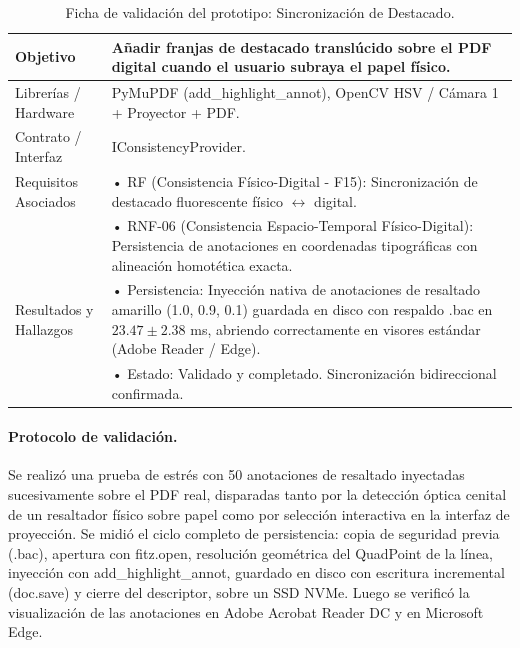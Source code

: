 \begin{table}[H]
    \centering
    \caption{Ficha de validación del prototipo: Sincronización de Destacado.}
    \label{tab:ficha_f15}
    \begin{tabular}{L{3.2cm} L{11.0cm}}
        \toprule
        Objetivo & Añadir franjas de destacado translúcido sobre el PDF digital cuando el usuario subraya el papel físico. \\ \midrule
        Librerías / Hardware & PyMuPDF (add\_highlight\_annot), OpenCV HSV / Cámara 1 + Proyector + PDF. \\ \midrule
        Contrato / Interfaz & IConsistencyProvider. \\ \midrule
        Requisitos Asociados &
        • RF (Consistencia Físico-Digital - F15): Sincronización de destacado fluorescente físico $\leftrightarrow$ digital. \vspace{0.1cm} \\
        & • RNF-06 (Consistencia Espacio-Temporal Físico-Digital): Persistencia de anotaciones en coordenadas tipográficas con alineación homotética exacta. \\ \midrule
        Resultados y Hallazgos &
        • Persistencia: Inyección nativa de anotaciones de resaltado amarillo (1.0, 0.9, 0.1) guardada en disco con respaldo .bac en $23.47 \pm 2.38$ ms, abriendo correctamente en visores estándar (Adobe Reader / Edge). \vspace{0.1cm} \\
        & • Estado: Validado y completado. Sincronización bidireccional confirmada. \\ \bottomrule
    \end{tabular}
\end{table}
 
\paragraph{Protocolo de validación.} Se realizó una prueba de estrés con 50 anotaciones de resaltado inyectadas sucesivamente sobre el PDF real, disparadas tanto por la detección óptica cenital de un resaltador físico sobre papel como por selección interactiva en la interfaz de proyección. Se midió el ciclo completo de persistencia: copia de seguridad previa (.bac), apertura con fitz.open, resolución geométrica del QuadPoint de la línea, inyección con add\_highlight\_annot, guardado en disco con escritura incremental (doc.save) y cierre del descriptor, sobre un SSD NVMe. Luego se verificó la visualización de las anotaciones en Adobe Acrobat Reader DC y en Microsoft Edge.
 
